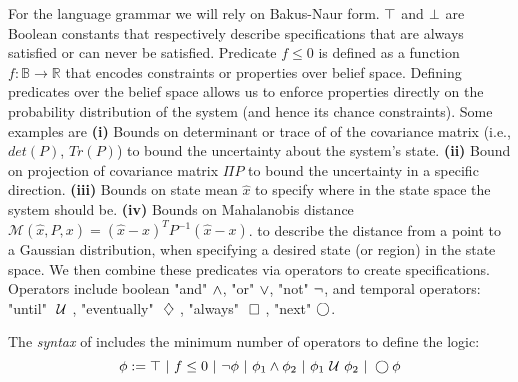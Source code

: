 \documentclass[conference]{IEEEtran}
\begin{document}
    For the language grammar we will rely on Bakus-Naur form. $\top$ and $\perp$ are Boolean constants that respectively describe specifications that are always satisfied or can never be satisfied. Predicate $f\leq 0$ is defined as a function $f:\mathbb{B}\rightarrow \mathbb{R}$ that encodes constraints or properties over belief space. Defining predicates over the belief space allows us to enforce properties directly on the probability distribution of the system (and hence its chance constraints). Some examples are \textbf{(i)} Bounds on determinant or trace of of the covariance matrix (i.e., $det(P)$, $Tr(P)$) to  bound the uncertainty about the system's state. \textbf{(ii)} Bound on projection of covariance matrix $\Pi P$ to bound the uncertainty in a specific direction.
    \textbf{(iii)} Bounds on state mean $\hat{x}$ to specify
    where in the state space the system should be. \textbf{(iv)} Bounds on Mahalanobis distance $\mathcal{M}(\hat{x},P,x) = (\hat{x}-x)^TP^{-1}(\hat{x}-x)$.
    to describe the distance from a point to a Gaussian distribution, when specifying a desired state (or region) in the state space. We then combine these predicates via operators to create specifications. Operators include boolean "and" $\wedge$, "or" $\vee$, "not" $\neg$, and temporal operators: "until" $\ \mathcal{U}\ $, "eventually" $\ \diamondsuit\ $, "always" $\ \square\ $, "next" $\bigcirc$.
    
    
    \begin{definition}
    \label{def:gdtl-syntax}
    The {\em syntax} of \DTL includes the minimum number of operators to define the logic:
    \begin{equation*}
     \phi :=  \top \ |\ f \leq 0 \ |\ \neg \phi \ |\ \phi_1 \wedge \phi_2 \ |\ \phi_1 \ \mathcal{U}\  \phi_2 \ |\ \bigcirc \phi
    \end{equation*}
    \end{definition}
\end{document}
